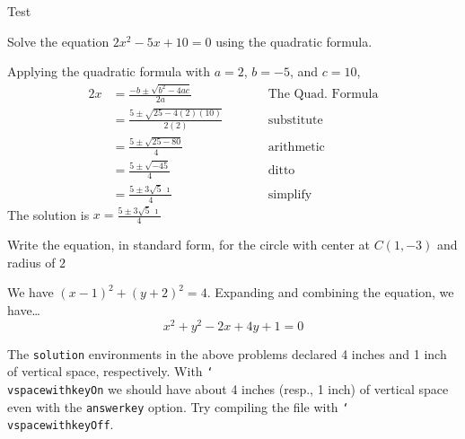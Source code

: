 \documentclass{article}
\newcommand{\cs}[1]{\texttt{\char`\\#1}}
\def\qt#1{&&\qquad\text{#1}}
\begin{document}
\begin{exam}{Test\nExam}
\begin{theseproblems}
\begin{problem}[10]
Solve the equation $2x^2 - 5x + 10 = 0 $ using the quadratic formula.
\begin{solution}[4in]
Applying the quadratic formula with $a=2$, $ b = -5 $, and $ c = 10 $,
\begin{alignat*}{2}
    x & = \frac{-b \pm \sqrt{b^2 -4ac}}{2a} \qt{The Quad.\ Formula}\\&
        = \frac{5 \pm \sqrt{25 -4(2)(10)}}{2(2)} \qt{substitute}\\&
        = \frac{5 \pm \sqrt{25 -80}}{4} \qt{arithmetic}\\&
        = \frac{5 \pm \sqrt{-45}}{4} \qt{ditto}\\&
        = \frac{5 \pm 3\sqrt{5}\,\imath}{4} \qt{simplify}
\end{alignat*}
The solution is $\boxed{x=\frac{5 \pm 3\sqrt{5}\,\imath}{4}}$
\end{solution}
\end{problem}

\begin{problem}[5]
Write the equation, in standard form, for the circle with center at
$C(1,-3)$ and radius of $2$
\begin{solution}[1in]
We have $(x-1)^2 + (y+2)^2 = 4 $. Expanding and combining the equation, we
have\dots \[\boxed{x^2+y^2-2x+4y+1=0}\]
\end{solution}
\end{problem}

\begin{eqComments}[Comments:]
The \texttt{solution} environments in the above problems declared 4 inches
and 1 inch of vertical space, respectively. With \cs{vspacewithkeyOn} we
should have about 4 inches (resp., 1 inch) of vertical space even with the
\texttt{answerkey} option. Try compiling the file with
\cs{vspacewithkeyOff}.
\end{eqComments}

\end{theseproblems}

\end{exam}
\end{document}
